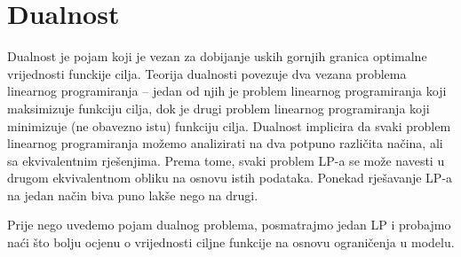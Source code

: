 \documentclass[a4paper, utf8, 11pt, colorlinks]{article}
\begin{document}

  \newpage
 \section{Dualnost}
 
 Dualnost je pojam koji je vezan za dobijanje uskih gornjih granica optimalne vrijednosti funckije cilja. Teorija dualnosti povezuje dva vezana problema linearnog programiranja -- jedan od njih je problem linearnog programiranja koji maksimizuje funkciju cilja, dok je drugi problem linearnog programiranja koji minimizuje (ne obavezno istu) funkciju cilja.  Dualnost implicira da svaki problem linearnog programiranja možemo analizirati na dva potpuno različita načina, ali sa ekvivalentnim rješenjima.   
  Prema tome, svaki problem LP-a se može navesti u drugom ekvivalentnom obliku na osnovu istih podataka. Ponekad rješavanje LP-a na jedan način biva puno lakše nego na drugi.
 
 
 
 Prije nego uvedemo pojam dualnog problema, posmatrajmo jedan LP i probajmo naći što bolju ocjenu o vrijednosti ciljne funkcije na osnovu ograničenja u modelu.
 
\end{document}

